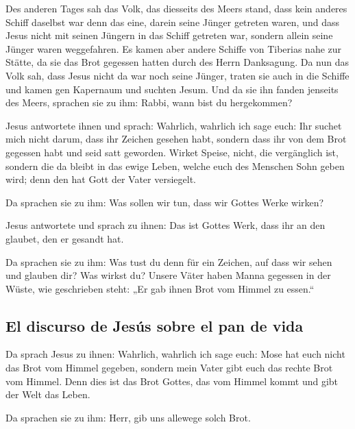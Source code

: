  Des anderen Tages sah das Volk, das diesseits des Meers
stand, dass kein anderes Schiff daselbst war denn das eine, darein seine
Jünger getreten waren, und dass Jesus nicht mit seinen Jüngern in das
Schiff getreten war, sondern allein seine Jünger waren weggefahren.
 Es kamen aber andere Schiffe von Tiberias nahe zur
Stätte, da sie das Brot gegessen hatten durch des Herrn Danksagung.
 Da nun das Volk sah, dass Jesus nicht da war noch seine
Jünger, traten sie auch in die Schiffe und kamen gen Kapernaum und
suchten Jesum.  Und da sie ihn fanden jenseits des Meers,
sprachen sie zu ihm: Rabbi, wann bist du hergekommen?

 Jesus antwortete ihnen und sprach: Wahrlich, wahrlich
ich sage euch: Ihr suchet mich nicht darum, dass ihr Zeichen gesehen
habt, sondern dass ihr von dem Brot gegessen habt und seid satt
geworden.  Wirket Speise, nicht, die vergänglich ist,
sondern die da bleibt in das ewige Leben, welche euch des Menschen Sohn
geben wird; denn den hat Gott der Vater versiegelt.

 Da sprachen sie zu ihm: Was sollen wir tun, dass wir
Gottes Werke wirken?

 Jesus antwortete und sprach zu ihnen: Das ist Gottes
Werk, dass ihr an den glaubet, den er gesandt hat.

 Da sprachen sie zu ihm: Was tust du denn für ein
Zeichen, auf dass wir sehen und glauben dir? Was wirkst du?
 Unsere Väter haben Manna gegessen in der Wüste, wie
geschrieben steht: „Er gab ihnen Brot vom Himmel zu essen.``

\hypertarget{el-discurso-de-jesuxfas-sobre-el-pan-de-vida}{%
\subsection{El discurso de Jesús sobre el pan de
vida}\label{el-discurso-de-jesuxfas-sobre-el-pan-de-vida}}

 Da sprach Jesus zu ihnen: Wahrlich, wahrlich ich sage
euch: Mose hat euch nicht das Brot vom Himmel gegeben, sondern mein
Vater gibt euch das rechte Brot vom Himmel.  Denn dies
ist das Brot Gottes, das vom Himmel kommt und gibt der Welt das Leben.

 Da sprachen sie zu ihm: Herr, gib uns allewege solch
Brot.

